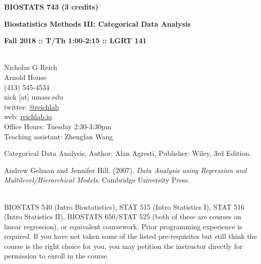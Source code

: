 \documentclass[10pt]{article}
\begin{document}
\centerline{\bf \large BIOSTATS 743 (3 credits)} 
\centerline{\bf \large Biostatistics Methods III: Categorical Data Analysis}
\centerline{\bf Fall 2018 :: T/Th 1:00-2:15  :: LGRT 141 }

\vspace{.25in}
\\
\noindent Nicholas G Reich \\
 Arnold House \\
\noindent (413) 545-4534 \\
\noindent nick [at] umass.edu \\
\noindent twitter: \href{https://twitter.com/reichlab}{@reichlab}\\
\noindent web: \href{https://reichlab.io}{reichlab.io}\\
\noindent Office Hours: Tuesday 2:30-3:30pm \\
\noindent Teaching assistant: Zhengfan Wang \\


\bigskip
{}


Categorical Data Analysis, Author: Alan Agresti, Publisher: Wiley, 3rd Edition.


Andrew Gelman and Jennifer Hill. (2007). \emph{Data Analysis using Regression and Multilevel/Hierarchical Models}. Cambridge University Press.





\bigskip
{}\\
BIOSTATS 540 (Intro Biostatistics), STAT 515 (Intro Statistics I), STAT 516 (Intro Statistics II), BIOSTATS 650/STAT 525 (both of these are courses on linear regression), or equivalent coursework. Prior programming experience is required. If you have not taken some of the listed pre-requisites but still think the course is the right choice for you, you may petition the instructor directly for permission to enroll in the course.
\end{document}
